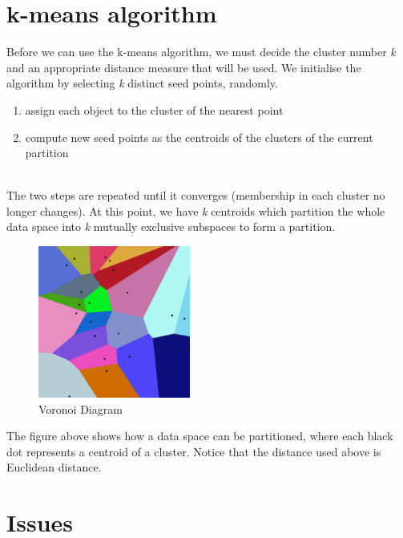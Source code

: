 \documentclass[11pt,fleqn]{book} %
\begin{document}
\section{k-means algorithm}
Before we can use the k-means algorithm, we must decide the cluster number \textit{k} and an appropriate distance measure that will be used. We initialise the algorithm by selecting \textit{k} distinct seed points, randomly.\\

\begin{enumerate}
	\item assign each object to the cluster of the nearest point
	\item compute new seed points as the centroids of the clusters of the current partition
\end{enumerate}

\ \\ \noindent
The two steps are repeated until it converges (membership in each cluster no longer changes). At this point, we have \textit{k} centroids which partition the whole data space into \textit{k} mutually exclusive subspaces to form a partition.\\

\begin{figure}[h]
	\centering
  	\includegraphics[width=50mm, scale=0.7]{Pictures/voronoi}
  	\caption{Voronoi Diagram}
\end{figure}

\noindent
The figure above shows how a data space can be partitioned, where each black dot represents a centroid of a cluster. Notice that the distance used above is Euclidean distance.

\section{Issues}
\end{document}
